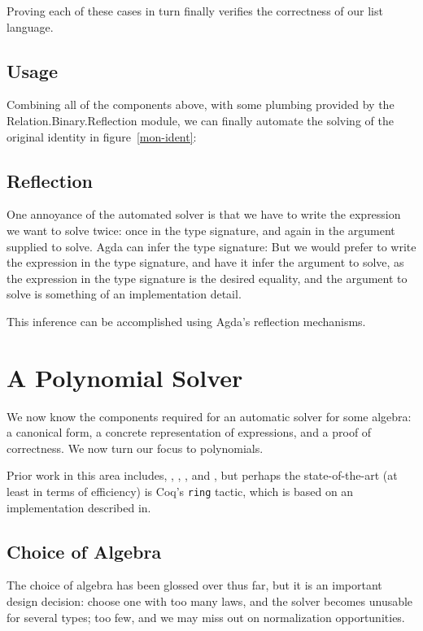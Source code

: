 \documentclass[draft, twocolumn]{article}
\theoremstyle{definition}
\begin{document}
Proving each of these cases in turn finally verifies the correctness of our list
language.

\subsection{Usage}
Combining all of the components above, with some plumbing provided by the
Relation.Binary.Reflection module, we can finally automate the solving of the
original identity in figure~\ref{mon-ident}:
\subsection{Reflection} \label{reflection}
One annoyance of the automated solver is that we have to write the expression we
want to solve twice: once in the type signature, and again in the argument
supplied to solve. Agda can infer the type signature:
But we would prefer to write the expression in the type signature, and have it
infer the argument to solve, as the expression in the type signature is the
desired equality, and the argument to solve is something of an implementation
detail.

 This inference can be accomplished using
Agda's reflection mechanisms.
\section{A Polynomial Solver}
We now know the components required for an automatic solver for some algebra: a
canonical form, a concrete representation of expressions, and a proof of
correctness. We now turn our focus to polynomials.

Prior work in this area includes\cite{geuvers_automatically_2017},
\cite{meshveliani_dependent_2013}, \cite{zalakain_evidence-providing_2017},
\cite{cheng_functional_2018}, and \cite{russino_polynomial_2017}, but perhaps
the state-of-the-art (at least in terms of efficiency) is Coq's \texttt{ring}
tactic\cite{the_coq_development_team_2018_1219885}, which is based on an
implementation described in\cite{hutchison_proving_2005}.
\subsection{Choice of Algebra}
The choice of algebra has been glossed over thus far, but it is an important
design decision: choose one with too many laws, and the solver becomes unusable
for several types; too few, and we may miss out on normalization opportunities.
\end{document}
